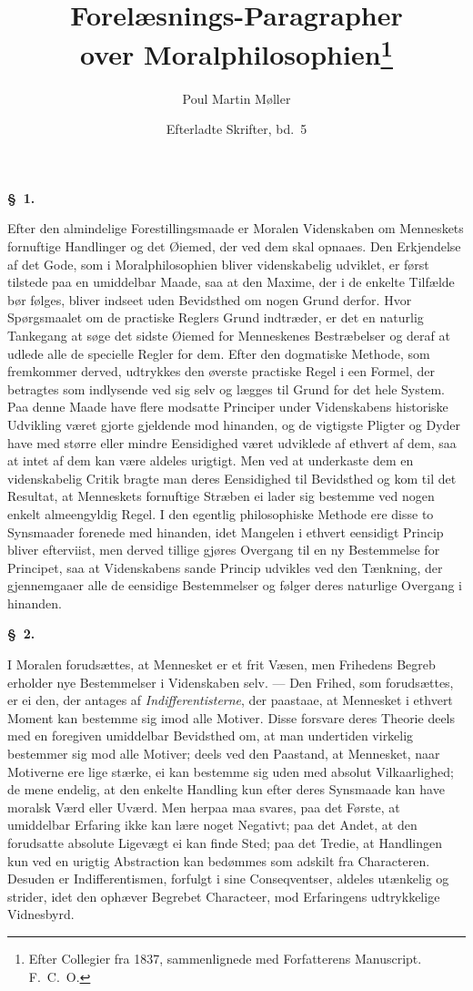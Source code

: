 \documentclass[12pt]{article}
\title{\textbf{Forelæsnings-Paragrapher\\[0.2em] over Moralphilosophien}\footnote{Efter Collegier fra 1837, sammenlignede med Forfatterens Manuscript. F.\ C.\ O.}}
\author{Poul Martin Møller}
\date{Efterladte Skrifter, bd.\ 5}
\newcommand{\opage}[1]{\marginnote{\footnotesize\textit{[#1]}}}
\newcommand{\slaw}[1]{\par\medskip\begin{center}\textbf{\S~#1.}\end{center}\nopagebreak}
\begin{document}
\maketitle

\slaw{1}
\opage{141}Efter den almindelige Forestillingsmaade er Moralen Videnskaben om Menneskets fornuftige Handlinger og det Øiemed, der ved dem skal opnaaes. Den Erkjendelse af det Gode, som i Moralphilosophien bliver videnskabelig udviklet, er først tilstede paa en umiddelbar Maade, saa at den Maxime, der i de enkelte Tilfælde bør følges, bliver indseet uden Bevidsthed om nogen Grund derfor. Hvor Spørgsmaalet om de practiske Reglers Grund indtræder, er det en naturlig Tankegang at søge det sidste Øiemed for Menneskenes Bestræbelser og deraf at udlede alle de specielle Regler for dem. Efter den dogmatiske Methode, som fremkommer derved, udtrykkes den øverste practiske Regel i een Formel, der betragtes som indlysende ved sig selv og lægges til Grund for det hele System. Paa denne Maade have flere modsatte Principer under Videnskabens historiske Udvikling været gjorte gjeldende mod hinanden, og de vigtigste Pligter og Dyder have med større eller mindre Eensidighed været udviklede af ethvert af dem, saa at intet af dem kan være aldeles urigtigt. Men ved at underkaste dem en videnskabelig Critik bragte man deres Eensidighed til Bevidsthed og kom til det Resultat, at Menneskets fornuftige Stræben ei lader sig bestemme ved nogen enkelt almeengyldig Regel. I den egentlig philosophiske Methode ere disse to Synsmaader forenede med hinanden, idet Mangelen i ethvert eensidigt Princip bliver efterviist, men derved tillige gjøres Overgang til en ny Bestemmelse for Principet, saa at Videnskabens sande Princip ud\opage{142}vikles ved den Tænkning, der gjennemgaaer alle de eensidige Bestemmelser og følger deres naturlige Overgang i hinanden.

\slaw{2}
I Moralen forudsættes, at Mennesket er et frit Væsen, men Frihedens Begreb erholder nye Bestemmelser i Videnskaben selv. --- Den Frihed, som forudsættes, er ei den, der antages af \emph{Indifferentisterne}, der paastaae, at Mennesket i ethvert Moment kan bestemme sig imod alle Motiver. Disse forsvare deres Theorie deels med en foregiven umiddelbar Bevidsthed om, at man undertiden virkelig bestemmer sig mod alle Motiver; deels ved den Paastand, at Mennesket, naar Motiverne ere lige stærke, ei kan bestemme sig uden med absolut Vilkaarlighed; de mene endelig, at den enkelte Handling kun efter deres Synsmaade kan have moralsk Værd eller Uværd. Men herpaa maa svares, paa det Første, at umiddelbar Erfaring ikke kan lære noget Negativt; paa det Andet, at den forudsatte absolute Ligevægt ei kan finde Sted; paa det Tredie, at Handlingen kun ved en urigtig Abstraction kan bedømmes som adskilt fra Characteren. Desuden er Indifferentismen, forfulgt i sine Conseqventser, aldeles utænkelig og strider, idet den ophæver Begrebet Characteer, mod Erfaringens udtrykkelige Vidnesbyrd.
\end{document}
